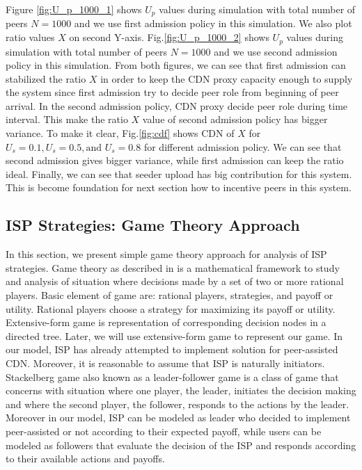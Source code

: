 \documentclass[paper]{ieice}
\begin{document}
Figure \ref{fig:U_p_1000_1} shows $U_p$ values during simulation with total number of peers $N=1000$ and we use first admission policy in this simulation. 
We also plot ratio values $X$ on second Y-axis.
Fig.\ref{fig:U_p_1000_2} shows $U_p$ values during simulation with total number of peers $N=1000$ and we use second admission policy in this simulation.  
From both figures, we can see that first admission can stabilized the ratio $X$ in order to keep the CDN proxy capacity enough to supply the system since first admission try to decide peer role from beginning of peer arrival. 
In the second admission policy, CDN proxy decide peer role during time interval.
This make the ratio $X$ value of second admission policy has bigger variance.
To make it clear, Fig.\ref{fig:cdf} shows CDN of $X$ for $U_s=0.1, U_s=0.5, \text{and }  U_s=0.8$ for different admission policy. 
We can see that second admission gives bigger variance, while first admission can keep the ratio ideal.
Finally, we can see that seeder upload has big contribution for this system. 
This is become foundation for next section how to incentive peers in this system.




\subsection{ISP Strategies: Game Theory Approach}
In this section, we present simple game theory approach for analysis of ISP strategies.
Game theory as described in \cite{gametheory} is a mathematical framework to study and analysis of situation where decisions made by a set of two or more rational players.
Basic element of game are: rational players, strategies, and payoff or utility.  
Rational players choose a strategy for maximizing its payoff or utility. 
Extensive-form game is representation of corresponding decision nodes in a directed tree.
Later, we will use extensive-form game to represent our game.
In our model, ISP has already attempted to implement solution for peer-assisted CDN.
Moreover, it is reasonable to assume that ISP is naturally initiators.  
Stackelberg game also known as a leader-follower game is a class of game that concerns with situation where one player, the leader, initiates the decision making and where the second player, the follower, responds to the actions by the leader.  
Moreover in our model, ISP can be modeled as leader who decided to implement peer-assisted or not according to their expected payoff, while users can be modeled as followers that evaluate the decision of the ISP and responds according to their available actions and payoffs.
\end{document}
